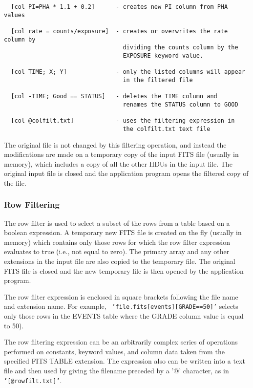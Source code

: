 \documentclass[11pt]{article}
\begin{document}
\begin{verbatim}
  [col PI=PHA * 1.1 + 0.2]      - creates new PI column from PHA values

  [col rate = counts/exposure]  - creates or overwrites the rate column by
                                  dividing the counts column by the
                                  EXPOSURE keyword value.

  [col TIME; X; Y]              - only the listed columns will appear
                                  in the filtered file

  [col -TIME; Good == STATUS]   - deletes the TIME column and
                                  renames the STATUS column to GOOD

  [col @colfilt.txt]            - uses the filtering expression in
                                  the colfilt.txt text file
\end{verbatim}

The original file is not changed by this filtering operation, and
instead the modifications are made on a temporary copy of the input
FITS file (usually in memory), which includes a copy of all the other
HDUs in the input file.   The original input file is closed and the
application program opens the filtered copy of the file.

\subsubsection{Row Filtering}

The row filter is used to select a subset of the rows from a table
based on a boolean expression.  A temporary new FITS file is created on
the fly (usually in memory) which contains only those rows for which
the row filter expression evaluates to true (i.e., not equal to zero).
The primary array and any other extensions in the input file are also
copied to the temporary file.  The original FITS file is closed and the
new temporary file is then opened by the application program.

The row filter expression is enclosed in square brackets following the
file name and extension name.  For example, {\tt
'file.fits[events][GRADE==50]'}  selects only those rows in the EVENTS
table where the GRADE column value is equal to 50).

The row filtering  expression can be an arbitrarily  complex series of
operations performed  on constants,  keyword values,  and column data
taken from the specified FITS TABLE extension.  The expression 
also can be written into a text file and then used by giving the
filename preceded by a '@' character, as in
{\tt '[@rowfilt.txt]'}.
\end{document}
